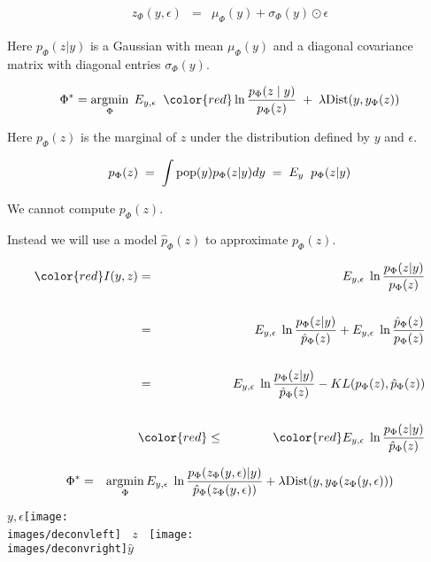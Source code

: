 {\vfill
\begin{eqnarray*}
z_\Phi(y,\epsilon) & = & \mu_\Phi(y) +\sigma_\Phi(y)\odot \epsilon
\end{eqnarray*}

\vfill
\vfill
Here $p_\Phi(z|y)$ is a Gaussian with mean $\mu_\Phi(y)$ and a diagonal covariance matrix with diagonal entries $\sigma_\Phi(y)$.


$$\Phi^* = \argmin_\Phi\; E_{y,\epsilon} \;\; {\color{red} \ln \frac{p_\Phi(z\; |\; y)}{p_\Phi(z)}}\; +\;\lambda\mathrm{Dist}(y,y_\Phi(z))$$

\vfill
Here $p_\Phi(z)$ is the marginal of $z$ under the distribution defined by $y$ and $\epsilon$.

\vfill
$$p_{\Phi}(z) \; = \; \int \mathrm{pop}(y)p_\Phi(z|y)dy \;=\;  E_{y}\;\;p_\Phi(z|y)$$

\vfill
We cannot compute $p_{\Phi}(z)$.

\vfill
Instead we will use a model $\hat{p}_\Phi(z)$ to approximate $p_{\Phi}(z)$.


\begin{eqnarray*}
{\color{red} I(y,z)}  & = & E_{y,\epsilon}\;\ln \frac{p_\Phi(z|y)}{p_{\Phi}(z)} \\
\\
& = & E_{y,\epsilon}\;\ln \frac{p_\Phi(z|y)}{\hat{p}_\Phi(z)} + E_{y,\epsilon}\;\ln\frac{\hat{p}_\Phi(z)}{p_{\Phi}(z)} \\
\\
& = & E_{y,\epsilon}\;\ln \frac{p_\Phi(z|y)}{\hat{p}_\Phi(z)} - KL(p_{\Phi}(z),\hat{p}_\Phi(z)) \\
\\
& {\color{red} \leq} & {\color{red} E_{y,\epsilon}\;\ln \frac{p_\Phi(z|y)}{\hat{p}_\Phi(z)}}
\end{eqnarray*}


{\huge
\begin{eqnarray*}
\Phi^* & = & \operatorname*{argmin}_\Phi E_{y,\epsilon}\;\ln \frac{p_\Phi(z_\Phi(y,\epsilon)|y)}{\hat{p}_\Phi(z_\Phi(y,\epsilon))}
+ \lambda \mathrm{Dist}(y,y_\Phi(z_\Phi(y,\epsilon)))
\end{eqnarray*}

\vfill
\centerline{$y,\epsilon$\texttt{[image: \\images/deconvleft]} $\;\;z\;\;$ \texttt{[image: \\images/deconvright]}$\hat{y}$}


}}
